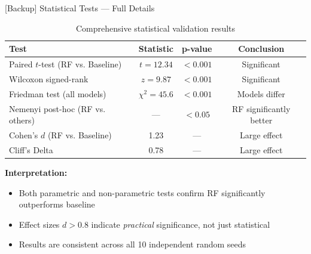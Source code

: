\documentclass[aspectratio=169]{beamer}
\begin{document}
\begin{frame}{[Backup] Statistical Tests --- Full Details}
\begin{table}
\small
\caption{Comprehensive statistical validation results}
\begin{tabular}{lccc}
\toprule
\textbf{Test} & \textbf{Statistic} & \textbf{p-value} & \textbf{Conclusion} \\
\midrule
Paired $t$-test (RF vs. Baseline) & $t = 12.34$     & $< 0.001$ & Significant \\
Wilcoxon signed-rank              & $z = 9.87$      & $< 0.001$ & Significant \\
Friedman test (all models)        & $\chi^2 = 45.6$ & $< 0.001$ & Models differ \\
Nemenyi post-hoc (RF vs. others)  & ---             & $< 0.05$  & RF significantly better \\
\midrule
Cohen's $d$ (RF vs. Baseline)     & 1.23            & ---       & Large effect \\
Cliff's Delta                     & 0.78            & ---       & Large effect \\
\bottomrule
\end{tabular}
\end{table}

\vspace{0.3cm}
\textbf{Interpretation:}
\begin{itemize}
    \item Both parametric and non-parametric tests confirm RF significantly outperforms baseline
    \item Effect sizes $d > 0.8$ indicate \textit{practical} significance, not just statistical
    \item Results are consistent across all 10 independent random seeds
\end{itemize}
\end{frame}
\end{document}

